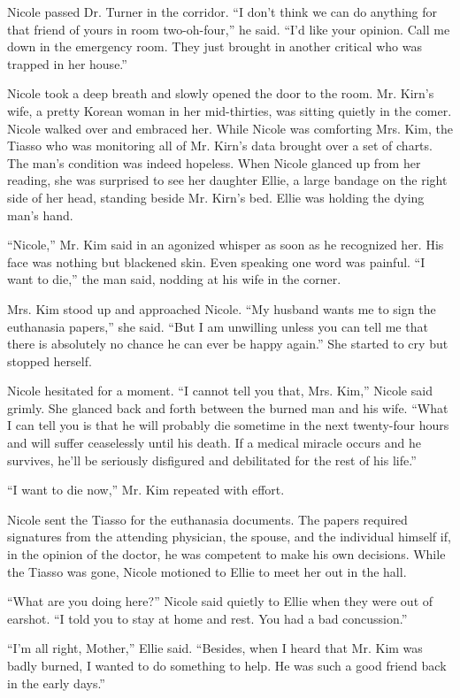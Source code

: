 \documentclass[]{article}
\begin{document}
{Nicole passed Dr. Turner in the corridor. “I don’t think we can do anything for that friend of yours in room two-oh-four,” he said. “I’d like your opinion. Call me down in the emergency room. They just brought in another critical who was trapped in her house.”

Nicole took a deep breath and slowly opened the door to the room. Mr. Kirn’s wife, a pretty Korean woman in her mid-thirties, was sitting quietly in the comer. Nicole walked over and embraced her. While Nicole was comforting Mrs. Kim, the Tiasso who was monitoring all of Mr. Kirn’s data brought over a set of charts. The man’s condition was indeed hopeless. When Nicole glanced up from her reading, she was surprised to see her daughter Ellie, a large bandage on the right side of her head, standing beside Mr. Kirn’s bed. Ellie was holding the dying man’s hand.

“Nicole,” Mr. Kim said in an agonized whisper as soon as he recognized her. His face was nothing but blackened skin. Even speaking one word was painful. “I want to die,” the man said, nodding at his wife in the corner.

Mrs. Kim stood up and approached Nicole. “My husband wants me to sign the euthanasia papers,” she said. “But I am unwilling unless you can tell me that there is absolutely no chance he can ever be happy again.” She started to cry but stopped herself.

Nicole hesitated for a moment. “I cannot tell you that, Mrs. Kim,” Nicole said grimly. She glanced back and forth between the burned man and his wife. “What I can tell you is that he will probably die sometime in the next twenty-four hours and will suffer ceaselessly until his death. If a medical miracle occurs and he survives, he’ll be seriously disfigured and debilitated for the rest of his life.”

“I want to die now,” Mr. Kim repeated with effort.

Nicole sent the Tiasso for the euthanasia documents. The papers required signatures from the attending physician, the spouse, and the individual himself if, in the opinion of the doctor, he was competent to make his own decisions. While the Tiasso was gone, Nicole motioned to Ellie to meet her out in the hall.

“What are you doing here?” Nicole said quietly to Ellie when they were out of earshot. “I told you to stay at home and rest. You had a bad concussion.”

“I’m all right, Mother,” Ellie said. “Besides, when I heard that Mr. Kim was badly burned, I wanted to do something to help. He was such a good friend back in the early days.”

}
\end{document}
